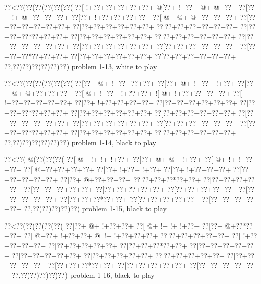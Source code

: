 \vbox{\vbox{\goo
\0??<\0??(\0??(\0??(\0??(\0??(\0??(
\0??[\- !+\0??+\0??+\0??+\0??+\0??+
\- @[\0??+\- !+\0??+\- @+\- @+\0??+
\0??[\0??+\- !+\- @+\0??+\0??+\0??+
\0??[\0??+\- !+\0??+\0??+\0??+\0??+
\0??[\- @+\- @+\- @+\0??+\0??+\0??+
\0??[\0??+\0??+\0??+\0??+\0??+\0??+
\0??[\0??+\0??+\0??+\0??+\0??+\0??+
\0??[\0??+\0??+\0??+\0??+\0??+\0??+
\0??[\0??+\0??+\0??*\0??+\0??+\0??+
\0??[\0??+\0??+\0??+\0??+\0??+\0??+
\0??[\0??+\0??+\0??+\0??+\0??+\0??+
\0??[\0??+\0??+\0??+\0??+\0??+\0??+
\0??[\0??+\0??+\0??+\0??+\0??+\0??+
\0??[\0??+\0??+\0??+\0??+\0??+\0??+
\0??[\0??+\0??+\0??*\0??+\0??+\0??+
\0??[\0??+\0??+\0??+\0??+\0??+\0??+
\0??[\0??+\0??+\0??+\0??+\0??+\0??+
\0??,\0??)\0??)\0??)\0??)\0??)\0??)
}
\hfil problem 1-13, white to play\hfil\break
}

\vbox{\vbox{\goo
\0??<\0??(\0??(\0??(\0??(\0??(\0??(
\0??[\0??+\- @+\- !+\0??+\0??+\0??+
\0??[\0??+\- @+\- !+\0??+\- !+\0??+
\0??[\0??+\- @+\- @+\0??+\0??+\0??+
\0??[\- @+\- !+\0??+\- !+\0??+\0??+
\- ![\- @+\- !+\0??+\0??+\0??+\0??+
\0??[\- !+\0??+\0??+\0??+\0??+\0??+
\0??[\0??+\- !+\0??+\0??+\0??+\0??+
\0??[\0??+\0??+\0??+\0??+\0??+\0??+
\0??[\0??+\0??+\0??*\0??+\0??+\0??+
\0??[\0??+\0??+\0??+\0??+\0??+\0??+
\0??[\0??+\0??+\0??+\0??+\0??+\0??+
\0??[\0??+\0??+\0??+\0??+\0??+\0??+
\0??[\0??+\0??+\0??+\0??+\0??+\0??+
\0??[\0??+\0??+\0??+\0??+\0??+\0??+
\0??[\0??+\0??+\0??*\0??+\0??+\0??+
\0??[\0??+\0??+\0??+\0??+\0??+\0??+
\0??[\0??+\0??+\0??+\0??+\0??+\0??+
\0??,\0??)\0??)\0??)\0??)\0??)\0??)
}
\hfil problem 1-14, black to play\hfil\break
}

\vbox{\vbox{\goo
\0??<\0??(\- @(\0??(\0??(\0??(
\0??[\- @+\- !+\- !+\- !+\0??+
\0??[\0??+\- @+\- @+\- !+\0??+
\0??[\- @+\- !+\- !+\0??+\0??+
\0??[\- @+\0??+\0??+\0??+\0??+
\0??[\0??+\- !+\0??+\- !+\0??+
\0??[\0??+\- !+\0??+\0??+\0??+
\0??[\0??+\0??+\0??+\0??+\0??+
\0??[\0??+\- @+\0??+\0??+\0??+
\0??[\0??+\0??+\0??*\0??+\0??+
\0??[\0??+\0??+\0??+\0??+\0??+
\0??[\0??+\0??+\0??+\0??+\0??+
\0??[\0??+\0??+\0??+\0??+\0??+
\0??[\0??+\0??+\0??+\0??+\0??+
\0??[\0??+\0??+\0??+\0??+\0??+
\0??[\0??+\0??+\0??*\0??+\0??+
\0??[\0??+\0??+\0??+\0??+\0??+
\0??[\0??+\0??+\0??+\0??+\0??+
\0??,\0??)\0??)\0??)\0??)\0??)
}
\hfil problem 1-15, black to play\hfil\break
}

\vbox{\vbox{\goo
\0??<\0??(\0??(\0??(\0??(\0??(
\0??[\0??+\- @+\- !+\0??+\0??+
\0??[\- @+\- !+\- !+\- !+\0??+
\0??[\0??+\- @+\0??*\0??+\0??+
\0??[\- @+\0??+\- !+\0??+\0??+
\- @[\- !+\- !+\0??+\0??+\0??+
\0??[\0??+\0??+\0??+\0??+\0??+
\0??[\- !+\0??+\0??+\0??+\0??+
\0??[\0??+\0??+\0??+\0??+\0??+
\0??[\0??+\0??+\0??*\0??+\0??+
\0??[\0??+\0??+\0??+\0??+\0??+
\0??[\0??+\0??+\0??+\0??+\0??+
\0??[\0??+\0??+\0??+\0??+\0??+
\0??[\0??+\0??+\0??+\0??+\0??+
\0??[\0??+\0??+\0??+\0??+\0??+
\0??[\0??+\0??+\0??*\0??+\0??+
\0??[\0??+\0??+\0??+\0??+\0??+
\0??[\0??+\0??+\0??+\0??+\0??+
\0??,\0??)\0??)\0??)\0??)\0??)
}
\hfil problem 1-16, black to play\hfil\break
}

